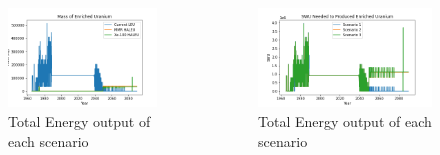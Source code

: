 \begin{frame}
\begin{columns}
        \column[t]{5cm}
    \begin{figure}[ht]
        \includegraphics[scale=0.25,trim=0 5 0 10,clip]{figures/enrichedU_all.png}
        \caption{Total Energy output of each scenario}
        \label{fig:enrichedU}
    \end{figure}
    \begin{figure}[ht]
        \includegraphics[scale=0.25,trim=0 5 0 10,clip]{figures/swu_all.png}
        \caption{Total Energy output of each scenario}
        \label{fig:swu}
    \end{figure}
    
        
        

    \end{columns}


\end{frame}

